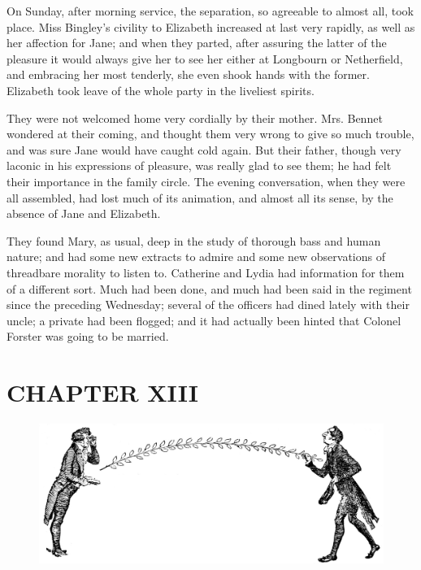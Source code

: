 On Sunday, after morning service, the separation, so agreeable to almost all, took place. Miss Bingley's civility to Elizabeth increased at last very rapidly, as well as her affection for Jane; and when they parted, after assuring the latter of the pleasure it would always give her to see her either at Longbourn or Netherfield, and embracing her most tenderly, she even shook hands with the former. Elizabeth took leave of the whole party in the liveliest spirits.

They were not welcomed home very cordially by their mother. Mrs. Bennet wondered at their coming, and thought them very wrong to give so much trouble, and was sure Jane would have caught cold again. But their father, though very laconic in his expressions of pleasure, was really glad to see them; he had felt their importance in the family circle. The evening conversation, when they were all assembled, had lost much of its animation, and almost all its sense, by the absence of Jane and Elizabeth.

They found Mary, as usual, deep in the study of thorough bass and human nature; and had some new extracts to admire and some new observations of threadbare morality to listen to. Catherine and Lydia had information for them of a different sort. Much had been done, and much had been said in the regiment since the preceding Wednesday; several of the officers had dined lately with their uncle; a private had been flogged; and it had actually been hinted that Colonel Forster was going to be married.

\chapter{CHAPTER XIII}

\begin{figure}[htbp]
    \centering
    \includegraphics[width=\textwidth]{illustrations/i_107_a.jpg}
\end{figure}

